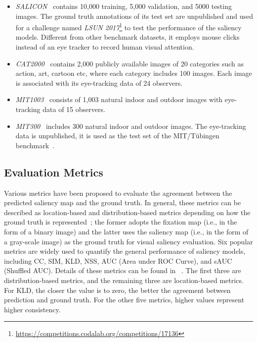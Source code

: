 \documentclass{article}
\begin{document}
\begin{itemize}
\item \textit{SALICON}~\cite{salicon2015} contains 10,000 training, 5,000 validation, and 5000 testing images. 
The ground truth annotations of its test set are unpublished and used for a challenge named \textit{LSUN 2017}\footnote{\url{https://competitions.codalab.org/competitions/17136}} to test the performance of the saliency models. 
Different from other benchmark datasets, it employs mouse clicks instead of an eye tracker to record human visual attention.  
\item \textit{CAT2000}~\cite{cat2000} contains 2,000 publicly available images of 20 categories such as action, art, cartoon etc, where each category includes 100 images. Each image is associated with its eye-tracking data of 24 observers. 
\item \textit{MIT1003}~\cite{MIT1003} consists of 1,003 natural indoor and outdoor images with eye-tracking data of 15 observers.
\item \textit{MIT300}~\cite{MIT300} includes 300 natural indoor and outdoor images. The eye-tracking data is unpublished, it is used as the test set of the MIT/Tübingen benchmark~\cite{benchmark}. 

\end{itemize}

\subsection{Evaluation Metrics}
Various metrics have been proposed to evaluate the agreement between the predicted saliency map and the ground truth. In general, these metrics can be described as location-based and distribution-based metrics depending on how the ground truth is represented~\cite{Bylinskii_2019}; the former adopts the fixation map (i.e., in the form of a binary image) and the latter uses the saliency map (i.e., in the form of a gray-scale image) as the ground truth for visual saliency evaluation. Six popular metrics are widely used to quantify the general performance of saliency models, including CC, SIM, KLD, NSS, AUC (Area under ROC Curve), and sAUC (Shuffled AUC). Details of these metrics can be found in ~\cite{Bylinskii_2019}. The first three are distribution-based metrics, and the remaining three are location-based metrics. For KLD, the closer the value is to zero, the better the agreement between prediction and ground truth. For the other five metrics, higher values represent higher consistency.
\end{document}
